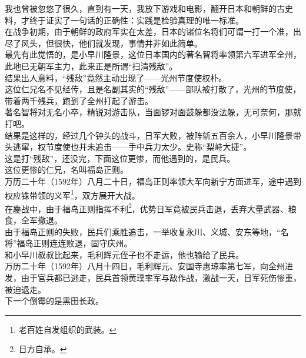 \begin{multicols}{\theparacolNo}
我也曾被忽悠了很久，直到有一天，我放下游戏和电影，翻开日本和朝鲜的古史料，才终于证实了一句话的正确性：实践是检验真理的唯一标准。\\

在战争初期，由于朝鲜的政府军实在太差，日本的诸位名将们可谓一打一个准，出尽了风头，但很快，他们就发现，事情并非如此简单。\\

最先有此觉悟的，是小早川隆景，这位日本国内的著名智将率领第六军进军全州，此地已无朝军主力，此来正是所谓“扫清残敌”。\\

结果出人意料，“残敌”竟然主动出现了——光州节度使权朴。\\

这位仁兄名不见经传，且是名副其实的“残敌”——部队被打散了，光州的节度使，带着两千残兵，跑到了全州打起了游击。\\

著名智将对无名小卒，精锐对游击队，当面锣对面鼓躲都没法躲，无可奈何，那就打吧。\\

结果是这样的，经过几个钟头的战斗，日军大败，被阵斩五百余人，小早川隆景带头逃窜，权节度使也并未追击——手中兵力太少。史称“梨峙大捷”。\\

这是打“残敌”，还没完，下面这位更惨，而他遇到的，是民兵。\\

这位更惨的仁兄，名叫福岛正则。\\

万历二十年（1592年）八月二十日，福岛正则率领大军向新宁方面进军，途中遇到权应铢带领的义军\footnote{老百姓自发组织的武装。}，双方展开大战。\\

在鏖战中，由于福岛正则指挥不利\footnote{日方自承。}，优势日军竟被民兵击退，丢弃大量武器、粮食，全军撤退。\\

由于福岛正则的失败，民兵们乘胜追击，一举收复永川、义城、安东等地，“名将”福岛正则连连败退，固守庆州。\\

和小早川叔叔比起来，毛利辉元侄子也不走运，他也输给了民兵。\\

万历二十年（1592年）八月十四日，毛利辉元、安国寺惠琼率第七军，向全州进发，由于官兵都已逃走，民兵首领黄璞率军与敌作战，激战一天，日军死伤惨重，被迫退走。\\

下一个倒霉的是黑田长政。\\


\end{multicols}
